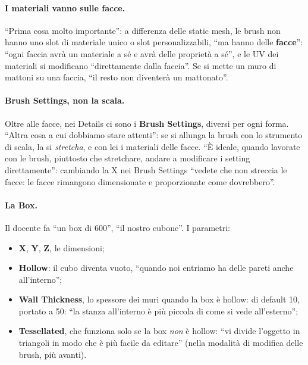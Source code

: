 \paragraph{I materiali vanno sulle facce.} ``Prima cosa molto importante'': a differenza
delle static mesh, le brush non hanno uno slot di materiale unico o slot personalizzabili,
``ma hanno delle \textbf{facce}'': ``ogni faccia avrà un materiale a sé e avrà delle
proprietà a sé'', e le UV dei materiali si modificano ``direttamente dalla faccia''. Se si
mette un muro di mattoni su una faccia, ``il resto non diventerà un mattonato''.

\paragraph{Brush Settings, non la scala.} Oltre alle facce, nei Details ci sono i
\textbf{Brush Settings}, diversi per ogni forma. ``Altra cosa a cui dobbiamo stare
attenti'': se si allunga la brush con lo strumento di scala, la si \emph{stretcha}, e con
lei i materiali delle facce. ``È ideale, quando lavorate con le brush, piuttosto che
stretchare, andare a modificare i setting direttamente'': cambiando la X nei Brush
Settings ``vedete che non streccia le facce: le facce rimangono dimensionate e
proporzionate come dovrebbero''.

\paragraph{La Box.} Il docente fa ``un box di 600'', ``il nostro cubone''. I parametri:
\begin{itemize}
  \item \textbf{X}, \textbf{Y}, \textbf{Z}, le dimensioni;
  \item \textbf{Hollow}: il cubo diventa vuoto, ``quando noi entriamo ha delle pareti anche
        all'interno'';
  \item \textbf{Wall Thickness}, lo spessore dei muri quando la box è hollow: di default 10,
        portato a 50: ``la stanza all'interno è più piccola di come si vede all'esterno'';
  \item \textbf{Tessellated}, che funziona solo se la box \emph{non} è hollow: ``vi divide
        l'oggetto in triangoli in modo che è più facile da editare'' (nella modalità di
        modifica delle brush, più avanti).
\end{itemize}

